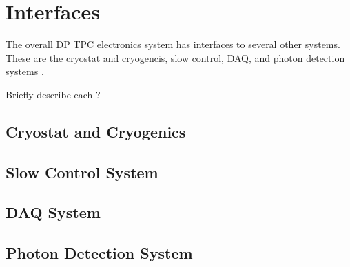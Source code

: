 \section{Interfaces}
\label{sec:fddp-tpc-elec-intfc}

The overall DP TPC electronics system has interfaces to several other systems. These are the cryostat and cryogencis, slow control, DAQ, and photon detection systems .

Briefly describe each ?



\subsection{Cryostat and Cryogenics}
\label{sec:fddp-tpc-elec-intfc-cryo}

\subsection{Slow Control System}
\label{sec:fddp-tpc-elec-intfc-sc}

\subsection{DAQ System}
\label{sec:fddp-tpc-elec-intfc-daq}

\subsection{Photon Detection System}
\label{sec:fddp-tpc-elec-intfc-pmt}




